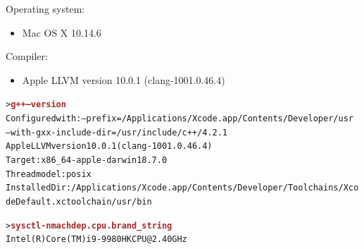 \documentclass[10pt]{article}
\begin{document}
Operating system:
\begin{itemize}
\item Mac OS X 10.14.6
\end{itemize}

Compiler: 
\begin{itemize}
\item Apple LLVM version 10.0.1 (clang-1001.0.46.4)
\end{itemize}

\begin{alltt}
\footnotesize
> \textbf{\textcolor{brown}{g++ --version}}
Configured with: --prefix=/Applications/Xcode.app/Contents/Developer/usr
                 --with-gxx-include-dir=/usr/include/c++/4.2.1
Apple LLVM version 10.0.1 (clang-1001.0.46.4)
Target: x86_64-apple-darwin18.7.0
Thread model: posix
InstalledDir: /Applications/Xcode.app/Contents/Developer/Toolchains/XcodeDefault.xctoolchain/usr/bin

> \textbf{\textcolor{brown}{sysctl -n machdep.cpu.brand_string}}                                                                                                                                                 
Intel(R) Core(TM) i9-9980HK CPU @ 2.40GHz
\end{alltt}
\end{document}

